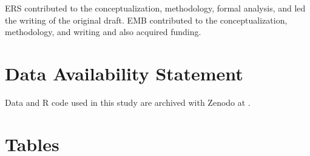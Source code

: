 \documentclass[
]{article}
\begin{document}
ERS contributed to the conceptualization, methodology, formal analysis, and led the writing of the original draft.
EMB contributed to the conceptualization, methodology, and writing and also acquired funding.

\hypertarget{data-availability-statement}{%
\section{Data Availability Statement}\label{data-availability-statement}}

Data and R code used in this study are archived with Zenodo at .

\pagebreak

\hypertarget{tables}{%
\section{Tables}\label{tables}}
\end{document}
